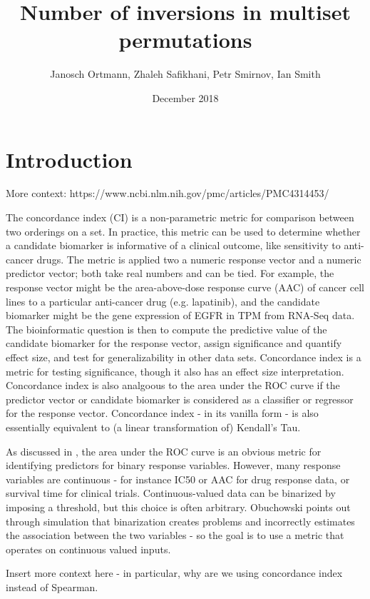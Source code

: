 \documentclass{article}
\title{Number of inversions in multiset permutations}
\author{Janosch Ortmann, Zhaleh Safikhani, Petr Smirnov, Ian Smith}
\date{December 2018}
\begin{document}
\maketitle

\section{Introduction}
More context: https://www.ncbi.nlm.nih.gov/pmc/articles/PMC4314453/ \citep{Kang2015}
% 

The concordance index (CI) is a non-parametric metric for comparison between two orderings on a set.  In practice, this metric can be used to determine whether a candidate biomarker is informative of a clinical outcome, like sensitivity to anti-cancer drugs.  The metric is applied two a numeric response vector and a numeric predictor vector; both take real numbers and can be tied.  For example, the response vector might be the area-above-dose response curve (AAC) of cancer cell lines to a particular anti-cancer drug (e.g. lapatinib), and the candidate biomarker might be the gene expression of EGFR in TPM from RNA-Seq data.  The bioinformatic question is then to compute the predictive value of the candidate biomarker for the response vector, assign significance and quantify effect size, and test for generalizability in other data sets.  Concordance index is a metric for testing significance, though it also has an effect size interpretation.  Concordance index is also analgoous to the area under the ROC curve if the predictor vector or candidate biomarker is considered as a classifier or regressor for the response vector.   Concordance index - in its vanilla form - is also essentially equivalent to (a linear transformation of) Kendall's Tau.  

As discussed in \cite{Obuchowski2006}, the area under the ROC curve is an obvious metric for identifying predictors for binary response variables.  However, many response variables are continuous - for instance IC50 or AAC for drug response data, or survival time for clinical trials.  Continuous-valued data can be binarized by imposing a threshold, but this choice is often arbitrary.  Obuchowski points out through simulation that binarization creates problems and incorrectly estimates the association between the two variables - so the goal is to use a metric that operates on continuous valued inputs. 

Insert more context here - in particular, why are we using concordance index instead of Spearman.
\end{document}
